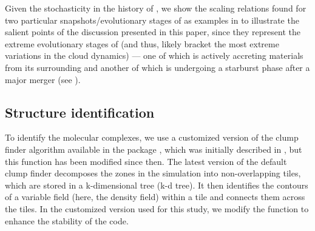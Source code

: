 \IfFileExists{emulateapjlegacy.cls}{\documentclass[iop]{emulateapjlegacy}}{\documentclass[iop]{emulateapj}}
\begin{document}
Given the stochasticity in the \SF history of \flower,
we show the scaling relations found for two particular snapshots/evolutionary stages of \flower
as examples in  to illustrate the salient points of the discussion presented in this paper,
since they represent the extreme evolutionary stages of \flower (and thus, likely bracket the
most extreme variations in the cloud dynamics) --- one of which \flower is
actively accreting materials from its surrounding 
and another of which \flower is undergoing
a starburst phase after a major merger (see ).


\subsection{Structure identification} \label{sec:method}
To identify the molecular complexes, we use a customized version of the clump finder algorithm available in the  package  \citep{Turk2011a}, which was initially described in \citet{Smith09a}, but this function has been modified since then.
%
The latest version of the default  clump finder decomposes the zones in the simulation into non-overlapping tiles, which are stored in a k-dimensional tree (k-d tree). It then identifies the contours of a variable field (here, the density field) within a tile and connects them across the tiles. 
In the customized version used for this study, we modify the function to enhance the stability of the code.
\end{document}
